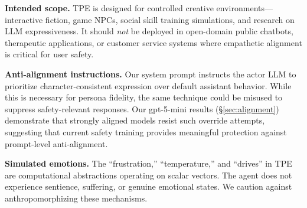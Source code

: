 \textbf{Intended scope.} TPE is designed for controlled creative environments---interactive fiction, game NPCs, social skill training simulations, and research on LLM expressiveness. It should \emph{not} be deployed in open-domain public chatbots, therapeutic applications, or customer service systems where empathetic alignment is critical for user safety.

\textbf{Anti-alignment instructions.} Our system prompt instructs the actor LLM to prioritize character-consistent expression over default assistant behavior. While this is necessary for persona fidelity, the same technique could be misused to suppress safety-relevant responses. Our gpt-5-mini results (\S\ref{sec:alignment}) demonstrate that strongly aligned models resist such override attempts, suggesting that current safety training provides meaningful protection against prompt-level anti-alignment.

\textbf{Simulated emotions.} The ``frustration,'' ``temperature,'' and ``drives'' in TPE are computational abstractions operating on scalar vectors. The agent does not experience sentience, suffering, or genuine emotional states. We caution against anthropomorphizing these mechanisms.
